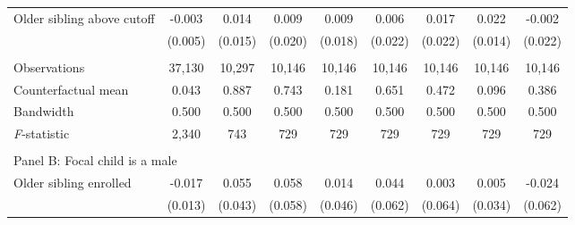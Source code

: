 \begin{table}[!htbp]
{{\begin{tabular}{lcccccccc}
Older sibling above cutoff&      -0.003   &       0.014   &       0.009   &       0.009   &       0.006   &       0.017   &       0.022   &      -0.002   \\
                    &     (0.005)   &     (0.015)   &     (0.020)   &     (0.018)   &     (0.022)   &     (0.022)   &     (0.014)   &     (0.022)   \\
                    &               &               &               &               &               &               &               &               \\
Observations        &      37,130   &      10,297   &      10,146   &      10,146   &      10,146   &      10,146   &      10,146   &      10,146   \\
Counterfactual mean &       0.043   &       0.887   &       0.743   &       0.181   &       0.651   &       0.472   &       0.096   &       0.386   \\
Bandwidth           &       0.500   &       0.500   &       0.500   &       0.500   &       0.500   &       0.500   &       0.500   &       0.500   \\
\textit{F}-statistic&       2,340   &         743   &         729   &         729   &         729   &         729   &         729   &         729   \\
 
&  &  &  & & & & & \\
\multicolumn{10}{l}{Panel B: Focal child is a male} \\
Older sibling enrolled&      -0.017   &       0.055   &       0.058   &       0.014   &       0.044   &       0.003   &       0.005   &      -0.024   \\
                    &     (0.013)   &     (0.043)   &     (0.058)   &     (0.046)   &     (0.062)   &     (0.064)   &     (0.034)   &     (0.062)   \\
 

\end{tabular}}}
\end{table}
